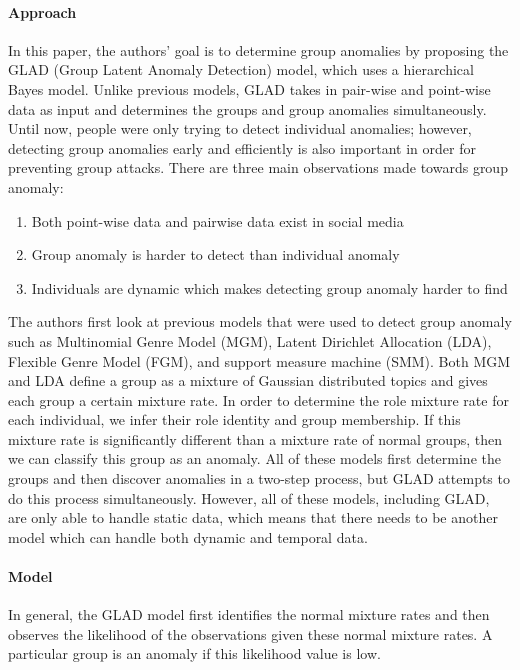 \documentclass[11pt, oneside]{article}   	%
\begin{document}
\paragraph{Approach}
\quad

\quad In this paper, the authors' goal is to determine group anomalies by proposing the GLAD \cite{glad} (Group Latent Anomaly Detection) model, which uses a hierarchical Bayes model.
Unlike previous models, GLAD takes in pair-wise and point-wise data as input and determines the groups and group anomalies simultaneously.
Until now, people were only trying to detect individual anomalies; however, detecting group anomalies early and efficiently is also important in order for preventing group attacks.
There are three main observations made towards group anomaly:
\begin{enumerate}
	\item Both point-wise data and pairwise data exist in social media
	\item Group anomaly is harder to detect than individual anomaly
	\item Individuals are dynamic which makes detecting group anomaly harder to find
\end{enumerate}

\quad The authors first look at previous models that were used to detect group anomaly such as Multinomial Genre Model (MGM), Latent Dirichlet Allocation (LDA), Flexible Genre Model (FGM), and support measure machine (SMM).
Both MGM and LDA define a group as a mixture of Gaussian distributed topics and gives each group a certain mixture rate.
In order to determine the role mixture rate for each individual, we infer their role identity and group membership.
If this mixture rate is significantly different than a mixture rate of normal groups, then we can classify this group as an anomaly.
All of these models first determine the groups and then discover anomalies in a two-step process, but GLAD attempts to do this process simultaneously.
However, all of these models, including GLAD, are only able to handle static data, which means that there needs to be another model which can handle both dynamic and temporal data.

\paragraph{Model}
\quad

\quad In general, the GLAD model first identifies the normal mixture rates and then observes the likelihood of the observations given these normal mixture rates.
A particular group is an anomaly if this likelihood value is low.
\end{document}
